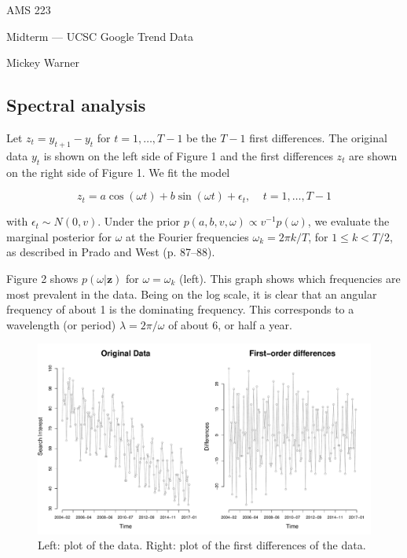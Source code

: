 \documentclass[12pt]{article}
\newcommand{\m}[1]{\mathbf{\bm{#1}}}
\begin{document}
\noindent AMS 223

\noindent Midterm --- UCSC Google Trend Data

\noindent Mickey Warner

\subsection*{Spectral analysis}

\noindent Let $z_t = y_{t+1}-y_t$ for $t=1,\ldots,T-1$ be the $T-1$ first differences. The original data $y_t$ is shown on the left side of Figure 1 and the first differences $z_t$ are shown on the right side of Figure 1. We fit the model

\[ z_t = a \cos(\omega t) + b \sin(\omega t) + \epsilon_t,~~~~~t=1,\ldots,T-1 \]

\noindent with $\epsilon_t\sim N(0, v)$. Under the prior $p(a,b,v,\omega) \propto v^{-1}p(\omega)$, we evaluate the marginal posterior for $\omega$ at the Fourier frequencies $\omega_k = 2\pi k/T$, for $1\leq k < T/2$, as described in Prado and West (p. 87--88).
\bigskip

\noindent Figure 2 shows $p(\omega|\m{z})$ for $\omega=\omega_k$ (left). This graph shows which frequencies are most prevalent in the data. Being on the log scale, it is clear that an angular frequency of about 1 is the dominating frequency. This corresponds to a wavelength (or period) $\lambda=2\pi/\omega$ of about 6, or half a year.

\begin{figure}[H]
\begin{center}
\includegraphics[scale=0.36]{figs/data.pdf}
\end{center}
\caption{Left: plot of the data. Right: plot of the first differences of the data.}
\end{figure}
\end{document}
